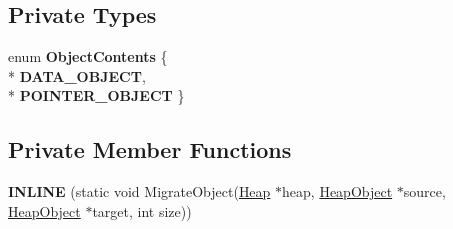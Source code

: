 \subsection*{Private Types}
\begin{DoxyCompactItemize}
\item 
enum {\bfseries Object\+Contents} \{ \\*
{\bfseries D\+A\+T\+A\+\_\+\+O\+B\+J\+E\+CT}, 
\\*
{\bfseries P\+O\+I\+N\+T\+E\+R\+\_\+\+O\+B\+J\+E\+CT}
 \}\hypertarget{classv8_1_1internal_1_1_scavenging_visitor_ace5a710b6c22df4f9bb6f7c4957bd7cb}{}\label{classv8_1_1internal_1_1_scavenging_visitor_ace5a710b6c22df4f9bb6f7c4957bd7cb}

\end{DoxyCompactItemize}
\subsection*{Private Member Functions}
\begin{DoxyCompactItemize}
\item 
{\bfseries I\+N\+L\+I\+NE} (static void Migrate\+Object(\hyperlink{classv8_1_1internal_1_1_heap}{Heap} $\ast$heap, \hyperlink{classv8_1_1internal_1_1_heap_object}{Heap\+Object} $\ast$source,                                                                                                                                   \hyperlink{classv8_1_1internal_1_1_heap_object}{Heap\+Object} $\ast$target, int size))\hypertarget{classv8_1_1internal_1_1_scavenging_visitor_a3fc28f2aed06545f7f265757a00697d3}{}\label{classv8_1_1internal_1_1_scavenging_visitor_a3fc28f2aed06545f7f265757a00697d3}

\end{DoxyCompactItemize}
